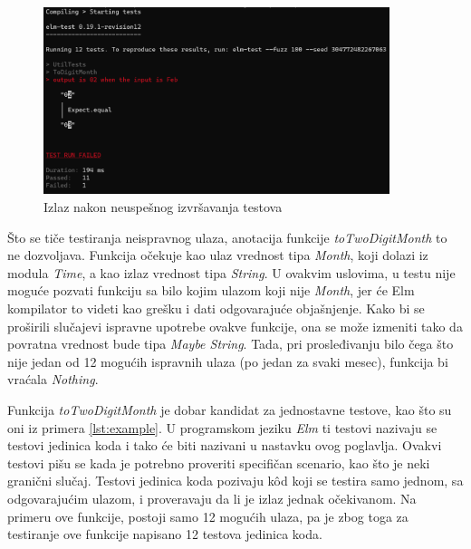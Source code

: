 \documentclass[12pt,oneside]{memoir}
\begin{document}
\begin{figure}[!ht]
  \centering
  \includegraphics[width=0.9\textwidth]{elmfail.png}
  \caption{Izlaz nakon neuspešnog izvršavanja testova}
  \label{fig:elmfail}
\end{figure}

\par Što se tiče testiranja neispravnog ulaza, anotacija funkcije \emph{toTwoDigitMonth} to ne dozvoljava. Funkcija očekuje kao ulaz vrednost tipa \emph{Month}, koji dolazi iz modula \emph{Time}, a kao izlaz vrednost tipa \emph{String}. U ovakvim uslovima, u testu nije moguće pozvati funkciju sa bilo kojim ulazom koji nije \emph{Month}, jer će Elm kompilator to videti kao grešku i dati odgovarajuće objašnjenje. Kako bi se proširili slučajevi ispravne upotrebe ovakve funkcije, ona se može izmeniti tako da povratna vrednost bude tipa \emph{Maybe String}. Tada, pri prosleđivanju bilo čega što nije jedan od 12 mogućih ispravnih ulaza (po jedan za svaki mesec), funkcija bi vraćala \emph{Nothing}.
\par Funkcija \emph{toTwoDigitMonth} je dobar kandidat za jednostavne testove, kao što su oni iz primera \ref{lst:example}. U programskom jeziku \emph{Elm} ti testovi nazivaju se testovi jedinica koda i tako će biti nazivani u nastavku ovog poglavlja. Ovakvi testovi pišu se kada je potrebno proveriti specifičan scenario, kao što je neki granični slučaj. Testovi jedinica koda pozivaju k\^{o}d koji se testira samo jednom, sa odgovarajućim ulazom, i proveravaju da li je izlaz jednak očekivanom. Na primeru ove funkcije, postoji samo 12 mogućih ulaza, pa je zbog toga za testiranje ove funkcije napisano 12 testova jedinica koda. 
\end{document}
